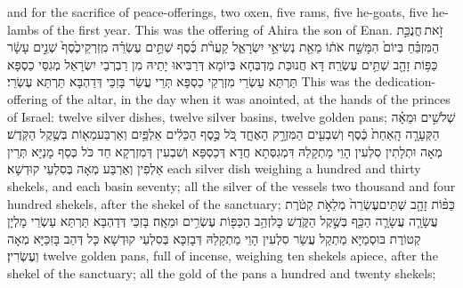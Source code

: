 {and for the sacrifice of peace-offerings, two oxen, five rams, five he-goats, five he-lambs of the first year. This was the offering of Ahira the son of Enan.}{}
{זֹ֣את \legarmeh  חֲנֻכַּ֣ת הַמִּזְבֵּ֗חַ בְּיוֹם֙ הִמָּשַׁ֣ח אֹת֔וֹ מֵאֵ֖ת נְשִׂיאֵ֣י יִשְׂרָאֵ֑ל קַעֲרֹ֨ת כֶּ֜סֶף שְׁתֵּ֣ים עֶשְׂרֵ֗ה מִֽזְרְקֵי\maqqaf כֶ֙סֶף֙ שְׁנֵ֣ים עָשָׂ֔ר כַּפּ֥וֹת זָהָ֖ב שְׁתֵּ֥ים עֶשְׂרֵֽה׃}
{דָּא חֲנוּכַּת מַדְבְּחָא בְּיוֹמָא דְּרַבִּיאוּ יָתֵיהּ מִן רַבְרְבֵי יִשְׂרָאֵל מְגִסֵּי כַסְפָּא תַּרְתַּא עַשְׂרֵי מִזְרְקֵי כַסְפָּא תְּרֵי עֲשַׂר בָּזִכֵּי דְּדַהְבָּא תַּרְתַּא עֶשְׂרֵי׃}
{This was the dedication-offering of the altar, in the day when it was anointed, at the hands of the princes of Israel: twelve silver dishes, twelve silver basins, twelve golden pans;}{}
{שְׁלֹשִׁ֣ים וּמֵאָ֗ה הַקְּעָרָ֤ה הָֽאַחַת֙ כֶּ֔סֶף וְשִׁבְעִ֖ים הַמִּזְרָ֣ק הָאֶחָ֑ד כֹּ֚ל כֶּ֣סֶף הַכֵּלִ֔ים אַלְפַּ֥יִם וְאַרְבַּע\maqqaf מֵא֖וֹת בְּשֶׁ֥קֶל הַקֹּֽדֶשׁ׃}
{מְאָה וּתְלָתִין סִלְעִין הָוֵי מַתְקָלַהּ דִּמְגִסְּתָא חֲדָא דְּכַסְפָּא וְשִׁבְעִין דְּמִזְרְקָא חַד כֹּל כְּסַף מָנַיָּא תְּרֵין אַלְפִין וְאַרְבַּע מְאָה בְּסִלְעֵי קוּדְשָׁא׃}
{each silver dish weighing a hundred and thirty shekels, and each basin seventy; all the silver of the vessels two thousand and four hundred shekels, after the shekel of the sanctuary;}{}
{כַּפּ֨וֹת זָהָ֤ב שְׁתֵּים\maqqaf עֶשְׂרֵה֙ מְלֵאֹ֣ת קְטֹ֔רֶת עֲשָׂרָ֧ה עֲשָׂרָ֛ה הַכַּ֖ף בְּשֶׁ֣קֶל הַקֹּ֑דֶשׁ כׇּל\maqqaf זְהַ֥ב הַכַּפּ֖וֹת עֶשְׂרִ֥ים וּמֵאָֽה׃}
{בָּזִכֵּי דְּדַהְבָּא תַּרְתַּא עַשְׂרֵי מָלְיָן קְטוֹרֶת בּוּסְמַיָּא מַתְקַל עֲשַׂר סִלְעִין הָוֵי מַתְקָלַהּ דְּבָזִכָּא בְּסִלְעֵי קוּדְשָׁא כָּל דְּהַב בָּזִכַּיָּא מְאָה וְעֶשְׂרִין׃}
{twelve golden pans, full of incense, weighing ten shekels apiece, after the shekel of the sanctuary; all the gold of the pans a hundred and twenty shekels;}{}
